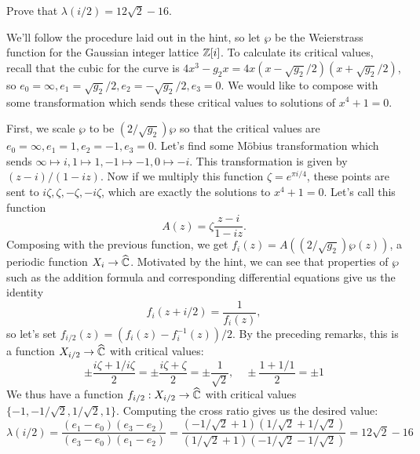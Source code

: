 \documentclass{pset}
\begin{document}
\begin{problem}{5.30}
  Prove that $\lambda(i/2) = 12\sqrt{2}-16$.
\end{problem}

\begin{solution}
  We'll follow the procedure laid out in the hint, so let $\wp$ be the Weierstrass function for the Gaussian integer lattice $\mathbb{Z}[i]$. To calculate its critical values, recall that the cubic for the curve is $4x^3-g_2x = 4x(x-\sqrt{g_2}/2)(x+\sqrt{g_2}/2)$, so $e_0 = \infty, e_1=\sqrt{g_2}/2, e_2=-\sqrt{g_2}/2, e_3=0$. We would like to compose with some transformation which sends these critical values to solutions of $x^4+1=0$.

  First, we scale $\wp$ to be $(2/\sqrt{g_2}) \wp$ so that the critical values are $e_0=\infty, e_1=1, e_2 = -1, e_3=0$. Let's find some M\"obius transformation which sends $\infty \mapsto i, 1 \mapsto 1, -1\mapsto -1, 0 \mapsto -i$. This transformation is given by $(z-i)/(1-iz)$. Now if we multiply this function $\zeta = e^{\pi i /4}$, these points are sent to $i\zeta, \zeta, -\zeta, -i\zeta$, which are exactly the solutions to $x^4+1=0$. Let's call this function
  \[
    A(z) =\zeta\frac{z-i}{1-iz}.
  \]
  Composing with the previous function, we get $f_i(z) = A((2/\sqrt{g_2}) \wp(z))$, a periodic function $X_i \to \widehat{\mathbb{C}}$. Motivated by the hint, we can see that properties of $\wp$ such as the addition formula and corresponding differential equations give us the identity
  \[
    f_i(z+i/2) = \frac{1}{f_i(z)},
  \]
  so let's set $f_{i/2}(z) = (f_{i}(z) - f_{i}^{-1}(z))/2$. By the preceding remarks, this is a function $X_{i/2} \to \widehat{\mathbb{C}}$ with critical values:
  \[
    \pm\frac{i\zeta + 1/i\zeta}{2} = \pm\frac{i\zeta + \zeta}{2} = \pm\frac{1}{\sqrt{2}},\quad \pm \frac{1+1/1}{2} = \pm 1
  \]
  We thus have a function $f_{i/2} : X_{i/2} \to \widehat{\mathbb{C}}$ with critical values $\{-1, -1/\sqrt{2}, 1/\sqrt{2}, 1\}$. Computing the cross ratio gives us the desired value:
  \[
    \lambda(i/2) = \frac{(e_1 - e_0)(e_3-e_2)}{(e_3 - e_0)(e_1 - e_2)} =\frac{(-1/\sqrt{2} + 1)(1/\sqrt{2}+1/\sqrt{2})}{(1/\sqrt{2}+1)(-1/\sqrt{2}-1/\sqrt{2})}= 12\sqrt{2}-16
  \]
\end{solution}
\end{document}
